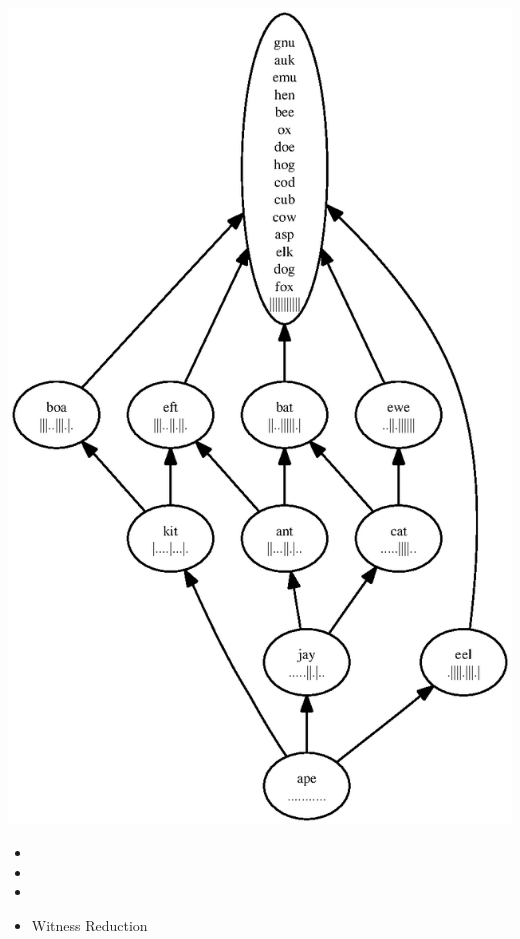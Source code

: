 \documentclass[svgnames,14pt]{beamer}
\theoremstyle{definition}
\begin{document}
\begin{frame}
\centerline{\includegraphics[height=\textheight]{success.ps}}
\end{frame}

\begin{frame}
\begin{itemize}
\frametitle{Overview}
\item {}
\item {}
\item {}
\item Witness Reduction
\end{itemize}
\end{frame}
\end{document}
